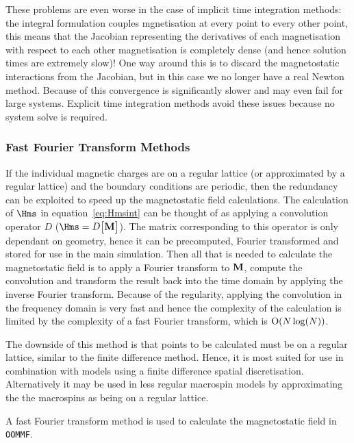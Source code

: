 These problems are even worse in the case of implicit time integration methods: the integral formulation couples mgnetisation at every point to every other point, this means that the Jacobian representing the derivatives of each magnetisation with respect to each other magnetisation is completely dense (and hence solution times are extremely slow)!
One way around this is to discard the magnetostatic interactions from the Jacobian\cite{DAquino2005}, but in this case we no longer have a real Newton method.
Because of this convergence is significantly slower and may even fail for large systems.
Explicit time integration methods avoid these issues because no system solve is required.

\subsubsection{Fast Fourier Transform Methods}

If the individual magnetic charges are on a regular lattice (or approximated by a regular lattice) and the boundary conditions are periodic, then the redundancy can be exploited to speed up the magnetostatic field calculations. The calculation of $\Hms$ in equation~\eqref{eq:Hmsint} can be thought of as applying a convolution operator $D$ (\ie $\Hms = D \big[\Mv\big]$). The matrix corresponding to this operator  is only dependant on geometry, hence it can be precomputed, Fourier transformed and stored for use in the main simulation. Then all that is needed to calculate the magnetostatic field is to apply a Fourier transform to $\mathbf{M}$, compute the convolution and transform the result back into the time domain by applying the inverse Fourier transform. Because of the regularity, applying the convolution in the frequency domain is very fast and hence the complexity of the calculation is limited by the complexity of a fast Fourier transform, which is $\text{O}(N \log(N))$.\cite{Jones1997}

The downside of this method is that points to be calculated must be on a regular lattice, similar to the finite difference method. Hence, it is most suited for use in combination with models using a finite difference spatial discretisation. Alternatively it may be used in less regular macrospin models by approximating the the macrospins as being on a regular lattice.\cite{Jones1997}

A fast Fourier transform method is used to calculate the magnetostatic field in \texttt{OOMMF}.\cite{oommf-website}

